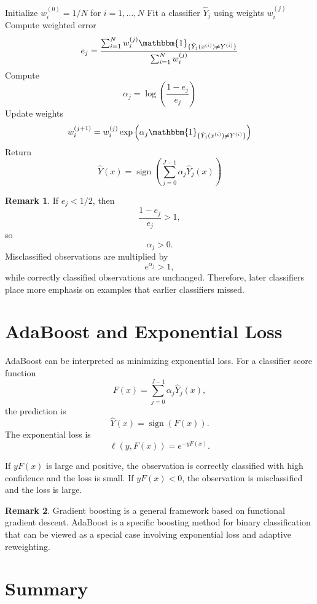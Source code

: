 \documentclass[12pt,oneside]{book}
\numberwithin{equation}{section}
\theoremstyle{definition}
\newtheorem{remark}{Remark}[section]
\theoremstyle{plain}
\theoremstyle{remark}
\newcommand{\ind}{\mathbbm{1}}
\begin{document}
\begin{algorithm}[H]
\caption{AdaBoost}
\begin{algorithmic}[1]
\State Initialize $w_i^{(0)}=1/N$ for $i=1,\ldots,N$
    \State Fit a classifier $\hat{Y}_j$ using weights $w_i^{(j)}$
    \State Compute weighted error
    \[
    e_j
    =
    \frac{
    \sum_{i=1}^N
    w_i^{(j)}
    \ind_{\{\hat{Y}_j(x^{(i)})\neq Y^{(i)}\}}
    }{
    \sum_{i=1}^N w_i^{(j)}
    }
    \]
    \State Compute
    \[
    \alpha_j=\log\left(\frac{1-e_j}{e_j}\right)
    \]
    \State Update weights
    \[
    w_i^{(j+1)}
    =
    w_i^{(j)}
    \exp\left(
    \alpha_j
    \ind_{\{\hat{Y}_j(x^{(i)})\neq Y^{(i)}\}}
    \right)
    \]
\EndFor
\State Return
\[
\hat{Y}(x)
=
\operatorname{sign}
\left(
\sum_{j=0}^{J-1}
\alpha_j\hat{Y}_j(x)
\right)
\]
\end{algorithmic}
\end{algorithm}

\begin{remark}
If $e_j<1/2$, then
\[
\frac{1-e_j}{e_j}>1,
\]
so
\[
\alpha_j>0.
\]
Misclassified observations are multiplied by
\[
e^{\alpha_j}>1,
\]
while correctly classified observations are unchanged. Therefore, later classifiers place more emphasis on examples that earlier classifiers missed.
\end{remark}

\section{AdaBoost and Exponential Loss}

AdaBoost can be interpreted as minimizing exponential loss. For a classifier score function
\[
F(x)=\sum_{j=0}^{J-1}\alpha_j\hat{Y}_j(x),
\]
the prediction is
\[
\hat{Y}(x)=\operatorname{sign}(F(x)).
\]
The exponential loss is
\[
\ell(y,F(x))=e^{-yF(x)}.
\]

If $yF(x)$ is large and positive, the observation is correctly classified with high confidence and the loss is small. If $yF(x)<0$, the observation is misclassified and the loss is large.

\begin{remark}
Gradient boosting is a general framework based on functional gradient descent. AdaBoost is a specific boosting method for binary classification that can be viewed as a special case involving exponential loss and adaptive reweighting.
\end{remark}

\section{Summary}
\end{document}
